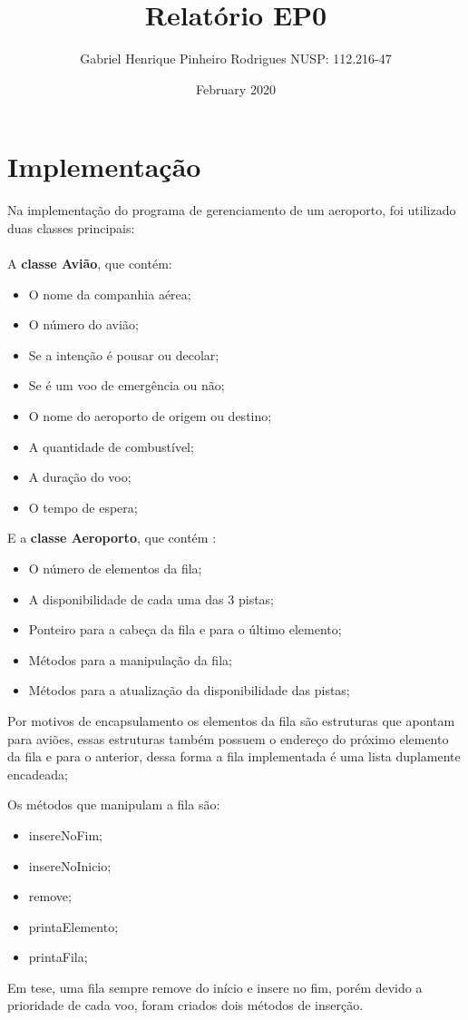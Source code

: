 \documentclass{article}
\title{Relatório EP0}
\author{Gabriel Henrique Pinheiro Rodrigues NUSP: 112.216-47}
\date{February 2020}
\begin{document}
   \maketitle
\section{Implementação}
Na implementação do programa de gerenciamento de um aeroporto, foi utilizado duas classes principais:
\\\\
A \textbf{classe Avião}, que contém:

\begin{itemize}
 \item O nome da companhia aérea;
 \item O número do avião;
 \item Se a intenção é pousar ou decolar;
 \item Se é um voo de emergência ou não;
 \item O nome do aeroporto de origem ou destino;
 \item A quantidade de combustível;
 \item A duração do voo;
 \item O tempo de espera;
\end{itemize}
E a \textbf{classe Aeroporto}, que contém :

\begin{itemize}
 \item O número de elementos da fila;
 \item A disponibilidade de cada uma das 3 pistas;
 \item Ponteiro para a cabeça da fila e para o último elemento;
 \item Métodos para a manipulação da fila;
 \item Métodos para a atualização da disponibilidade das pistas;
\end{itemize}

Por motivos de encapsulamento os elementos da fila são estruturas que apontam para aviões, essas estruturas também possuem o endereço do próximo elemento da fila e para o anterior, dessa forma a fila implementada é uma lista duplamente encadeada;

Os métodos que manipulam a fila são: 

\begin{itemize}
 \item insereNoFim;
 \item insereNoInicio;
 \item remove;
 \item printaElemento;
 \item printaFila;
\end{itemize}
Em tese, uma fila sempre remove do início e insere no fim, porém devido a prioridade de cada voo, foram criados dois métodos de inserção.
\end{document}
